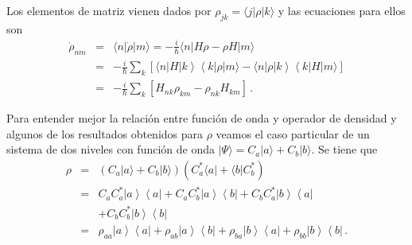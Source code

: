 \documentclass[12pt]{report}
\providecommand{\bra}[1]{\langle #1 \rvert}
\providecommand{\ket}[1]{\lvert #1 \rangle}
\newcommand{\ketbra}[2]{\left| {#1} \right\rangle\left\langle {#2}\right|}
\begin{document}
Los elementos de matriz vienen dados por 
$\rho_{jk} = \bra{j} \rho \ket{k}$ y las ecuaciones para ellos son 
%
\begin{eqnarray}
\dot{\rho}_{nm} &=& \bra{n} \dot{\rho} \ket{m} 
	= - \frac{i}{\hbar}  \bra{n}  H \rho -\rho H \ket{m}		\nonumber \\ 
&=& - \frac{i}{\hbar} \sum_k \left[  
	\bra{n}  H \ketbra{k}{k} \rho \ket{m} 
	-  \bra{n} \rho \ketbra{k}{k}  H \ket{m}  \right] 	\nonumber \\ 
&=& - \frac{i}{\hbar} \sum_k \left[ H_{nk} \rho_{km} - \rho_{nk} H_{km} \right] \,.
\end{eqnarray}

Para entender mejor la relaci\'on entre funci\'on de onda y operador de 
densidad y algunos de los resultados obtenidos para $\rho$ veamos el caso 
particular de un sistema de dos niveles con funci\'on de onda 
$\ket{\Psi} = C_a \ket{a} +C_b \ket{b}$.  Se tiene que 
%
\begin{eqnarray}
\rho &=& \left( C_a \ket{a} +C_b \ket{b} \right) 
	\left( C_a^\ast \bra{a} + \bra{b} C_b^\ast  \right)  	\nonumber \\ 
&=& C_a C_a^{\ast} \ketbra{a}{a} + C_a C_b^{\ast} \ketbra{a}{b} 
	+C_b C_a^{\ast} \ketbra{b}{a}  		\nonumber \\ 
	&& + C_b C_b^{\ast}\ketbra{b}{b} 		\nonumber \\ 
&=& \rho_{aa}  \ketbra{a}{a} +  \rho_{ab}  \ketbra{a}{b}  
	+  \rho_{ba} \ketbra{b}{a}  + \rho_{bb}  \ketbra{b}{b}  \,. \nonumber \\
\end{eqnarray}
\end{document}
